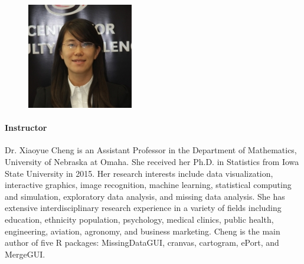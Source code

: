 \documentclass[11pt]{article}
\newcommand{\pkg}[1]{{\normalfont\fontseries{b}\selectfont #1}}
\begin{document}
\begin{figure}
  \vspace{-25pt}
  \begin{center}
    \includegraphics[width=\linewidth]{Cheng-Xiaoyue.jpg}
  \end{center}  
  \vspace{-25pt}
\end{figure}
\paragraph{Instructor}
Dr. Xiaoyue Cheng is an Assistant Professor in the Department of
Mathematics, University of Nebraska at Omaha. She received her
Ph.D. in Statistics from Iowa State University in 2015. Her research
interests include data visualization, interactive graphics, image
recognition, machine learning, statistical computing and simulation,
exploratory data analysis, and missing data analysis. She has
extensive interdisciplinary research experience in a variety of fields
including education, ethnicity population, psychology, medical
clinics, public health, engineering, aviation, agronomy, and business
marketing. Cheng is the main author of five R packages:
\pkg{MissingDataGUI}, \pkg{cranvas}, \pkg{cartogram},
\pkg{ePort}, and \pkg{MergeGUI}.
\end{document}
